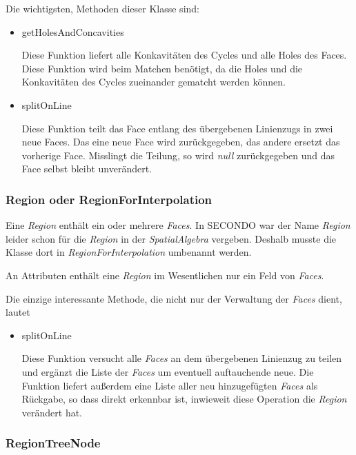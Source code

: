 Die wichtigsten, Methoden dieser Klasse sind:

\begin{itemize}

\item getHolesAndConcavities

Diese Funktion liefert alle Konkavitäten des Cycles und alle Holes des Faces. Diese Funktion wird beim Matchen benötigt, da die Holes und die Konkavitäten des Cycles zueinander gematcht werden können.

\item splitOnLine

Diese Funktion teilt das Face entlang des übergebenen Linienzugs in zwei neue Faces. Das eine neue Face wird zurückgegeben, das andere ersetzt das vorherige Face. Misslingt die Teilung, so wird \textit{null} zurückgegeben und das Face selbst bleibt unverändert.

\end{itemize}

\subsubsection{Region oder RegionForInterpolation}

Eine \textit{Region} enthält ein oder mehrere \textit{Faces}. In SECONDO war der Name \textit{Region} leider schon für die \textit{Region} in der \textit{SpatialAlgebra} vergeben. Deshalb musste die Klasse dort in \textit{RegionForInterpolation} umbenannt werden.

An Attributen enthält eine \textit{Region} im Wesentlichen nur ein Feld von \textit{Faces}.

Die einzige interessante Methode, die nicht nur der Verwaltung der \textit{Faces} dient, lautet 
\begin{itemize}
\item splitOnLine

Diese Funktion versucht alle \textit{Faces} an dem übergebenen Linienzug zu teilen und ergänzt die Liste der \textit{Faces} um eventuell auftauchende neue. Die Funktion liefert außerdem eine Liste aller neu hinzugefügten \textit{Faces} als Rückgabe, so dass direkt erkennbar ist, inwieweit diese Operation die \textit{Region} verändert hat.

\end{itemize}

\subsubsection{RegionTreeNode}

